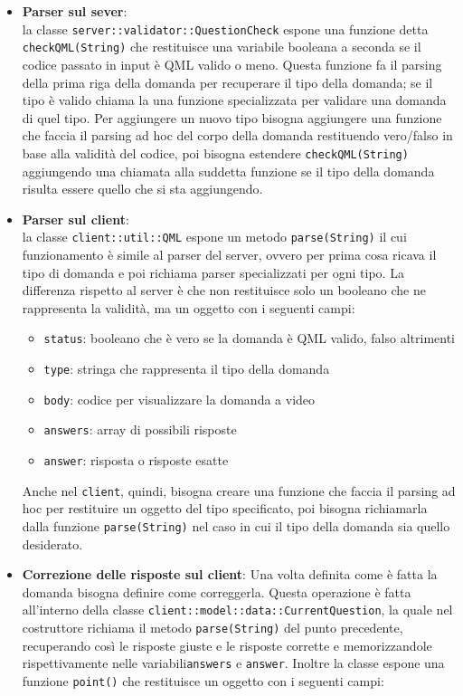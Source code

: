 \documentclass[12pt,a4paper]{article}
\begin{document}
	\begin{itemize}
	\item \textbf{Parser sul sever}:\\
	la classe \texttt{server::validator::QuestionCheck} espone una funzione detta \texttt{checkQML(String)} che restituisce una variabile booleana a seconda se il codice passato in input è QML valido o meno.
	Questa funzione fa il parsing della prima riga della domanda per recuperare il tipo della domanda; se il tipo è valido chiama la una funzione specializzata per validare una domanda di quel tipo. Per aggiungere un nuovo tipo bisogna aggiungere una funzione che faccia il parsing ad hoc del corpo della domanda restituendo vero/falso in base alla validità del codice, poi bisogna estendere \texttt{checkQML(String)} aggiungendo una chiamata alla suddetta funzione se il tipo della domanda risulta essere quello che si sta aggiungendo.
	\item \textbf{Parser sul client}:\\
	la classe \texttt{client::util::QML} espone un metodo \texttt{parse(String)} il cui funzionamento è simile al parser del server, ovvero per prima cosa ricava il tipo di domanda e poi richiama parser specializzati per ogni tipo. La differenza rispetto al server è che non restituisce solo un booleano che ne rappresenta la validità, ma un oggetto  con i seguenti campi:
	\begin{itemize}
	\item \texttt{status}: booleano che è vero se la domanda è QML valido, falso altrimenti
	\item \texttt{type}: stringa che rappresenta il tipo della domanda
	\item \texttt{body}: codice  per visualizzare la domanda a video
	\item \texttt{answers}: array di possibili risposte
	\item \texttt{answer}: risposta o risposte esatte
	\end{itemize}
	Anche nel \texttt{client}, quindi, bisogna creare una funzione che faccia il parsing ad hoc per restituire un oggetto del tipo specificato, poi bisogna richiamarla dalla funzione \texttt{parse(String)} nel caso in cui il tipo della domanda sia quello desiderato.
	\item \textbf{Correzione delle risposte sul client}:
	Una volta definita come è fatta la domanda bisogna definire come correggerla. Questa operazione è fatta all’interno della classe \texttt{client::model::data::CurrentQuestion}, la quale nel costruttore richiama il metodo \texttt{parse(String)} del punto precedente, recuperando così le risposte giuste e le risposte corrette e memorizzandole rispettivamente nelle variabili\texttt{answers} e \texttt{answer}. Inoltre la classe espone una funzione \texttt{point()} che restituisce un oggetto  con i seguenti campi:

\end{itemize}
\end{document}
